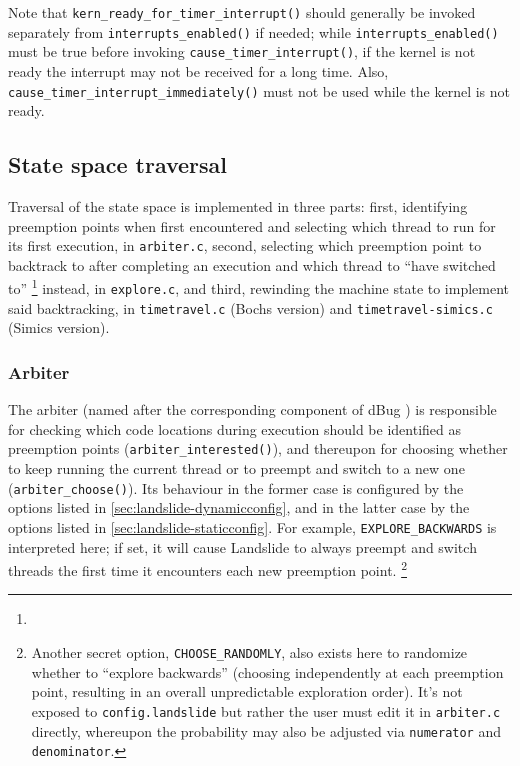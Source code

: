 Note that {\tt kern\_ready\_for\_timer\_interrupt()} should generally be invoked separately
from {\tt interrupts\_enabled()} if needed;
while {\tt interrupts\_enabled()} must be true before invoking {\tt cause\_timer\_interrupt()},
if the kernel is not ready the interrupt may not be received for a long time.
Also, {\tt cause\_timer\_interrupt\_immediately()} must not be used while the kernel is not ready.


\subsection{State space traversal}
\label{sec:landslide-statespace}

Traversal of the state space is implemented in three parts:
first, identifying preemption points when first encountered and selecting which thread to run for its first execution, in {\tt arbiter.c},
second, selecting which preemption point to backtrack to after completing an execution
and which thread to ``have switched to''
\footnote{}
instead, in {\tt explore.c},
and third, rewinding the machine state to implement said backtracking,
in {\tt timetravel.c} (Bochs version) and {\tt timetravel-simics.c} (Simics version).

\subsubsection{Arbiter}
\label{sec:landslide-arbiter}

The arbiter (named after the corresponding component of dBug \cite{dbug-ssv})
is responsible for checking which code locations during execution should be identified as preemption points
({\tt arbiter\_interested()}),
and thereupon for choosing whether to keep running the current thread or to preempt and switch to a new one
({\tt arbiter\_choose()}).
Its behaviour in the former case is configured by the options listed in \cref{sec:landslide-dynamicconfig},
and in the latter case by the options listed in \cref{sec:landslide-staticconfig}.
For example, {\tt EXPLORE\_BACKWARDS} is interpreted here;
if set, it will cause Landslide to always preempt and switch threads the first time it encounters each new preemption point.%
\footnote{Another secret option, {\tt CHOOSE\_RANDOMLY},
also exists here to randomize whether to ``explore backwards''
(choosing independently at each preemption point, resulting in an overall unpredictable exploration order).
It's not exposed to {\tt config.landslide} but rather the user must edit it in {\tt arbiter.c} directly,
whereupon the probability may also be adjusted via {\tt numerator} and {\tt denominator}.}

